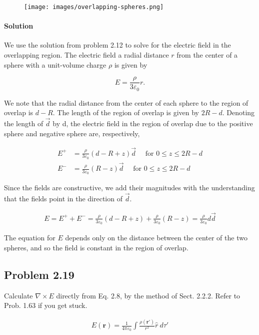\documentclass{article}
\begin{document}
 \begin{figure}[h]
     \centering
     \texttt{[image: images/overlapping-spheres.png]}
 \end{figure}

 \paragraph{Solution} We use the solution from problem 2.12 to solve for the electric field in the overlapping region.  The electric field a radial distance $r$ from the center of a sphere with a unit-volume charge $\rho$ is given by 
 
 $$
 E = \frac{\rho}{3\varepsilon_0}r.
 $$

 We note that the radial distance from the center of each sphere to the region of overlap is $d - R$. The length of the region of overlap is given by $2R - d$. Denoting the length of $\vec{d}$ by d, the electric field in the region of overlap due to the positive sphere and negative sphere are, respectively, 

 \begin{align*}
     E^+ &= \frac{\rho}{3\varepsilon_0}(d - R + z)\vec{d} \quad \text{ for } 0\leq z \leq 2R- d \\
     E^- &= \frac{\rho}{3\varepsilon_0}(R - z)\vec{d} \quad \text{ for } 0\leq z \leq 2R- d
 \end{align*}

Since the fields are constructive, we add their magnitudes with the understanding that the fields point in the direction of $\vec{d}$.

\begin{align*}
    E = E^+ + E^- = \frac{\rho}{3\varepsilon_0}(d - R + z) + \frac{\rho}{3\varepsilon_0}(R - z) = \frac{\rho}{3\varepsilon_0}d \vec{d}
\end{align*}

The equation for $E$ depends only on the distance between the center of the two spheres, and so the field is constant in the region of overlap.

\newpage

\subsection*{Problem 2.19}
 Calculate $\nabla \times E$ directly from Eq. 2.8, by the method of Sect. 2.2.2.  Refer to Prob. 1.63 if you get stuck. 
 
\begin{align*}
    E(\mathbf{r}) = \frac{1}{4\pi \varepsilon_0}\int \frac{\rho(\mathbf{r}')}{r^2}\hat{r}\ d\tau'
\end{align*}
\end{document}
